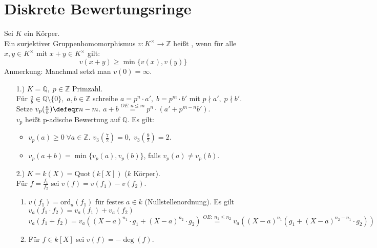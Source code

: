 \section{Diskrete Bewertungsringe}

\begin{Def} 
Sei $K$ ein Körper.\\
Ein surjektiver Gruppenhomomorphismus $v: K^{\times} \to \mathbb{Z}$ heißt
, wenn für alle $x,y \in
K^{\times}$ mit $x + y \in K^{\times}$ gilt:
$$ v(x+y) \geq \min\{v(x),v(y)\}$$
Anmerkung: Manchmal setzt man $v(0) = \infty$.
\end{Def}

\begin{nnBsp} 
\begin{enumerate}
  \item[1.)] $K = \mathbb{Q}, \; p \in \mathbb{Z}$ Primzahl.\\
  Für $\frac{a}{b} \in \mathbb{Q} \setminus \{0\}, \; a,b \in \mathbb{Z}$
  schreibe $a = p^n \cdot a', \; b = p^m \cdot b'$ mit $p \nmid a',\; p \nmid
  b'$.\\
  Setze $v_p(\frac{a}{b}) \defeqr n - m$.
  $a + b \overset{O\!\!E: n \leq m}{=} p^n \cdot (a' + p^{m-n} b')$.\\
  $v_p$ heißt p-adische Bewertung auf $\mathbb{Q}$. Es gilt:
  \begin{itemize}
    \item $v_p(a) \geq 0 \; \forall a \in \mathbb{Z}$. $v_3(\frac{7}{2}) = 0, \;
    v_3(\frac{9}{2})= 2$.
    \item $v_p(a+b) = \min\{v_p(a),v_p(b)\}$, falls $v_p(a) \not= v_p(b)$.
  \end{itemize}
  \item[2.)] $K = k(X) = \textrm{Quot}(k[X])$ ($k$ Körper).\\
  Für $f = \frac{f_1}{f_2}$ sei $v(f) = v(f_1) - v(f_2)$.
  \begin{enumerate}
    \item $v(f_1) = \textrm{ord}_a(f_1)$ für festes $a \in k$
    (Nullstellenordnung).
    Es gilt $v_a(f_1 \cdot f_2) = v_a(f_1) + v_a(f_2)$
    $v_a(f_1 + f_2) = v_a((X-a)^{n_1} \cdot g_1 + (X-a)^{n_2} \cdot g_2)
    \overset{O\!\!E: \; n_1 \leq n_2}{=} v_a((X-a)^{n_1}(g_1 + (X-a)^{n_2 - 
    n_1} \cdot g_2))$
    \item Für $f \in k[X]$ sei $v(f) = - \deg (f)$.
  \end{enumerate}
\end{enumerate}
\end{nnBsp}


